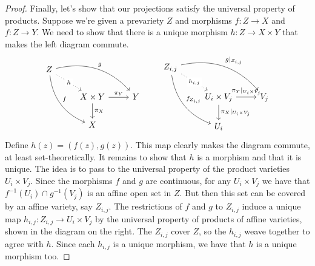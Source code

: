 \documentclass[11pt,letterpaper]{report}
\begin{document}
\begin{proof}
	\noindent Finally, let's show that our projections satisfy the universal property of products. Suppose we're given a prevariety $Z$ and morphisms $f: Z\to X$ and $f: Z\to Y$. We need to show that there is a unique morphism $h: Z\to X\times Y$ that makes the left diagram commute.
	\[
	\begin{tikzcd}
		Z
		\arrow[drr, bend left, "g"]
		\arrow[ddr, bend right, "f"]
		\arrow[dr, dotted, "h" description] & & \\
			& X \times Y
			\arrow[r, "\pi_Y"]
			\arrow[d, "\pi_X"]& Y\\
			& X
	\end{tikzcd}\qquad 
	\begin{tikzcd}
		Z_{i,j}
		\arrow[drr, bend left, "g|_{Z_{i,j}}"]
		\arrow[ddr, bend right, "f_{Z_{i,j}}"]
		\arrow[dr, dotted, "h_{i,j}" description] & & \\
			& U_i \times V_j
			\arrow[r, "\pi_Y|_{U_i\times V_j}"]
			\arrow[d, "\pi_X|_{U_i\times V_j}"]& V_j\\
			& U_i
	\end{tikzcd}
	\]
	Define $h(z) = (f(z), g(z))$. This map clearly makes the diagram commute, at least set-theoretically. It remains to show that $h$ is a morphism and that it is unique. The idea is to pass to the universal property of the product varieties $U_i\times V_j$. Since the morphisms $f$ and $g$ are continuous, for any $U_i\times V_j$ we have that $f^{-1}(U_i)\cap g^{-1}(V_j)$ is an affine open set in $Z$. But then this set can be covered by an affine variety, say $Z_{i,j}$. The restrictions of $f$ and $g$ to $Z_{i,j}$ induce a unique map $h_{i,j}: Z_{i,j}\to U_i\times V_j$ by the universal property of products of affine varieties, shown in the diagram on the right. The $Z_{i,j}$ cover $Z$, so the $h_{i,j}$ weave together to agree with $h$. Since each $h_{i,j}$ is a unique morphism, we have that $h$ is a unique morphism too.
\end{proof}
\end{document}
